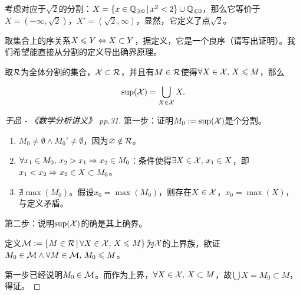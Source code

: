 \begin{example}
	
	考虑对应于$\sqrt{2}$的分割：$X=\{x\in\QQ_{\geqslant 0}\setvert x^2<2\}\cup \QQ_{\leqslant 0}$，那么它等价于$X=(-\infty,\sqrt{2})$，$X'=(\sqrt{2},\infty)$，显然，它定义了点$\sqrt{2}$。
	
\end{example}

取集合上的序关系$X\leqslant Y \Lrar X\subset Y$，据定义，它是一个良序（请写出证明）。我们希望能直接从分割的定义导出确界原理。

\begin{proposition}[确界原理]
	
	取$\cal{R}$为全体分割的集合，$\cal{X}\subset\cal{R}$，并且有$M\in\cal{R}$使得$\forall X\in\cal{X},\, X\leqslant M$，那么
	
	$$ \sup(\cal{X})=\bigcup_{X\in\cal{X}}X. $$
	
	\begin{proof}[于品 - 《数学分析讲义》 pp.31]
		
		第一步：证明$M_0 := \sup(\cal{X})$是个分割。
		
		\begin{enumerate}
			
			\item $M_0 \neq \emptyset \wedge M_0' \neq \emptyset$，因为$\emptyset \notin \cal{R}$。
			
			\item $\forall x_1\in M_0,\, x_2>x_1\Rar x_2\in M_0$：条件使得$\exists X\in \cal{X},\, x_1\in X$，即$x_1<x_2\Rar x_2\in X\subset M_0$。
			
			\item $\nexists\max(M_0)$。假设$x_0=\max(M_0)$，则存在$X\in\cal{X}$，$x_0=\max(X)$，与定义矛盾。
			
		\end{enumerate}
		
		第二步：说明$\sup(\cal{X})$的确是其上确界。
		
		定义$\cal{M}:=\{M\in\cal{R}\setvert \forall X\in\cal{X},\, X\leqslant M\}$为$\cal{X}$的上界族，欲证$M_0\in\cal{M}\wedge\forall M\in\cal{M},\, M_0\leqslant M$。
		
		第一步已经说明$M_0\in\cal{M}$。而作为上界，$\forall X\in\cal{X},\, X\subset M$，故$\bigcup X=M_0\subset M$，得证。
		
	\end{proof}
	
\end{proposition}

